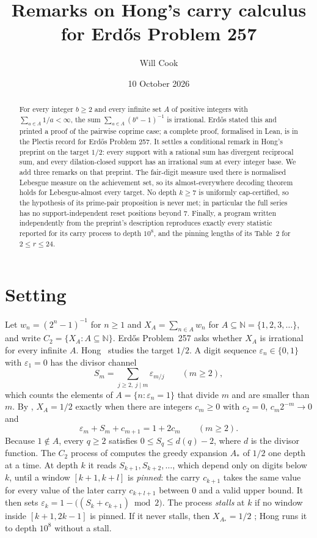 \documentclass[11pt]{amsart}
\title{Remarks on Hong's carry calculus for Erd\H{o}s Problem 257}
\author{Will Cook}
\date{10 October 2026}
\newcommand{\N}{\mathbb N}
\begin{document}
\begin{abstract}
For every integer $b\ge2$ and every infinite set $A$ of positive integers
with $\sum_{a\in A}1/a<\infty$, the sum $\sum_{a\in A}(b^a-1)^{-1}$ is
irrational. Erd\H{o}s stated this and printed a proof of the pairwise coprime
case; a complete proof, formalised in Lean, is in the Plectis record for
Erd\H{o}s Problem 257. It settles a conditional remark in Hong's preprint on
the target $1/2$: every support with a rational sum has divergent reciprocal
sum, and every dilation-closed support has an irrational sum at every
integer base. We add three remarks on that preprint. The fair-digit measure
used there is normalised Lebesgue measure on the achievement set, so its
almost-everywhere decoding theorem holds for Lebesgue-almost every target.
No depth $k\ge7$ is uniformly cap-certified, so the hypothesis of its prime-pair
proposition is never met; in particular the full series has no
support-independent reset positions beyond $7$. Finally, a program written
independently from the preprint's description reproduces exactly every
statistic reported for its carry process to depth $10^8$, and the pinning
lengths of its Table~2 for $2\le r\le 24$.
\end{abstract}

\maketitle

\section{Setting}

Let $w_n=(2^n-1)^{-1}$ for $n\ge1$ and $X_A=\sum_{n\in A}w_n$ for
$A\subseteq\N=\{1,2,3,\dots\}$, and write $C_2=\{X_A:A\subseteq\N\}$.
Erd\H{o}s Problem~257 asks whether $X_A$ is irrational for every infinite $A$.
Hong~\cite{hong} studies the target $1/2$. A digit sequence
$\varepsilon_n\in\{0,1\}$ with $\varepsilon_1=0$ has the divisor channel
\[
 S_m=\sum_{j\ge2,\ j\mid m}\varepsilon_{m/j}\qquad(m\ge2),
\]
which counts the elements of $A=\{n:\varepsilon_n=1\}$ that divide $m$ and are
smaller than $m$. By \cite[Lemma~2.6 and Proposition~7.1]{hong}, $X_A=1/2$
exactly when there are integers $c_m\ge0$ with $c_2=0$,
$c_m2^{-m}\to0$ and
\begin{equation}\label{eq:carry}
 \varepsilon_m+S_m+c_{m+1}=1+2c_m\qquad(m\ge2).
\end{equation}
Because $1\notin A$, every $q\ge2$ satisfies $0\le S_q\le d(q)-2$, where $d$ is
the divisor function. The $C_2$ process of \cite[\S6]{hong} computes the
greedy expansion $A_*$ of $1/2$ one depth at a time. At depth $k$ it reads
$S_{k+1},S_{k+2},\dots$, which depend only on digits below $k$, until a window
$[k+1,k+l]$ is \emph{pinned}: the carry $c_{k+1}$ takes the same value for
every value of the later carry $c_{k+l+1}$ between $0$ and a valid upper bound.
It then sets
$\varepsilon_k=1-\bigl((S_k+c_{k+1})\bmod 2\bigr)$. The process \emph{stalls} at
$k$ if no window inside $[k+1,2k-1]$ is pinned. If it never stalls, then
$X_{A_*}=1/2$ \cite[Theorem~6.1]{hong}; Hong runs it to depth $10^8$ without a
stall.
\end{document}
